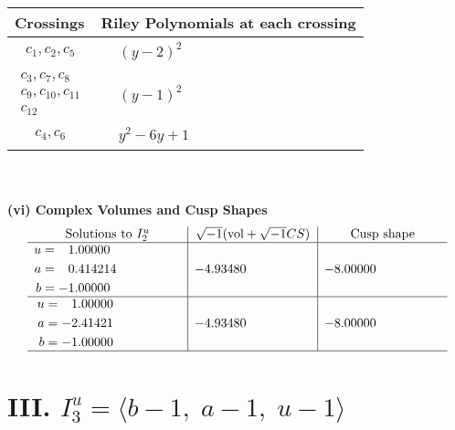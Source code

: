\documentclass[1p]{elsarticle_modified}
\theoremstyle{definition}
\newcommand{\I}{\sqrt{-1}}
\begin{document}
\begin{tabular}{m{50pt}|m{274pt}}
Crossings & \hspace{64pt}Riley Polynomials at each crossing \\
\hline $$\begin{aligned}c_{1},c_{2},c_{5}\end{aligned}$$&$\begin{aligned}
&(y-2)^2
\end{aligned}$\\
\hline $$\begin{aligned}c_{3},c_{7},c_{8}\\c_{9},c_{10},c_{11}\\c_{12}\end{aligned}$$&$\begin{aligned}
&(y-1)^2
\end{aligned}$\\
\hline $$\begin{aligned}c_{4},c_{6}\end{aligned}$$&$\begin{aligned}
&y^2-6 y+1
\end{aligned}$\\
\hline
\end{tabular}\\~\\
\newpage\flushleft \textbf{(vi) Complex Volumes and Cusp Shapes}
$$\begin{array}{c|c|c}  
\text{Solutions to }I^u_{2}& \I (\text{vol} + \sqrt{-1}CS) & \text{Cusp shape}\\
 \hline 
\begin{aligned}
u &= \phantom{-}1.00000\phantom{ +0.000000I} \\
a &= \phantom{-}0.414214\phantom{ +0.000000I} \\
b &= -1.00000\phantom{ +0.000000I}\end{aligned}
 & -4.93480\phantom{ +0.000000I} & -8.00000\phantom{ +0.000000I} \\ \hline\begin{aligned}
u &= \phantom{-}1.00000\phantom{ +0.000000I} \\
a &= -2.41421\phantom{ +0.000000I} \\
b &= -1.00000\phantom{ +0.000000I}\end{aligned}
 & -4.93480\phantom{ +0.000000I} & -8.00000\phantom{ +0.000000I}\\
 \hline 
 \end{array}$$\newpage\newpage\renewcommand{\arraystretch}{1}
\centering \section*{III. $I^u_{3}= \langle b-1,\;a-1,\;u-1 \rangle$}
\end{document}
